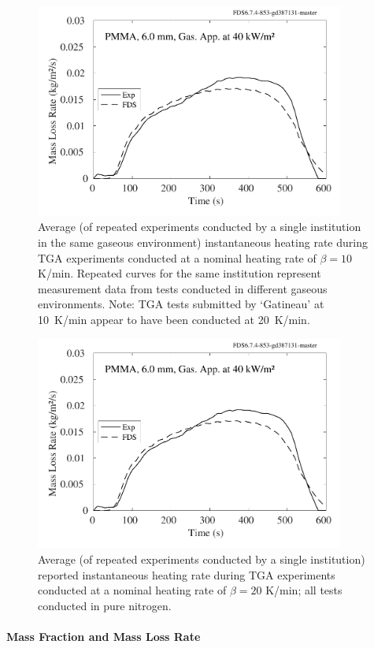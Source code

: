 \documentclass{book}
\begin{document}
\begin{figure}
  \centering
  \includegraphics[width=4in]{SCRIPT_FIGURES/PMMA_40}
  \caption{Average (of repeated experiments conducted by a single institution in the same gaseous environment) instantaneous heating rate during TGA experiments conducted at a nominal heating rate of $\beta=10$ K/min. Repeated curves for the same institution represent measurement data from tests conducted in different gaseous environments. Note: TGA tests submitted by ‘Gatineau’ at 10~K/min appear to have been conducted at 20~K/min.}
  \label{Fig_2}
\end{figure}

\begin{figure}
  \centering
  \includegraphics[width=4in]{SCRIPT_FIGURES/PMMA_40}
  \caption{Average (of repeated experiments conducted by a single institution) reported instantaneous heating rate during TGA experiments conducted at a nominal heating rate of $\beta=20$ K/min; all tests conducted in pure nitrogen.}
  \label{Fig_3}
\end{figure}


\paragraph{Mass Fraction and Mass Loss Rate}
\end{document}
